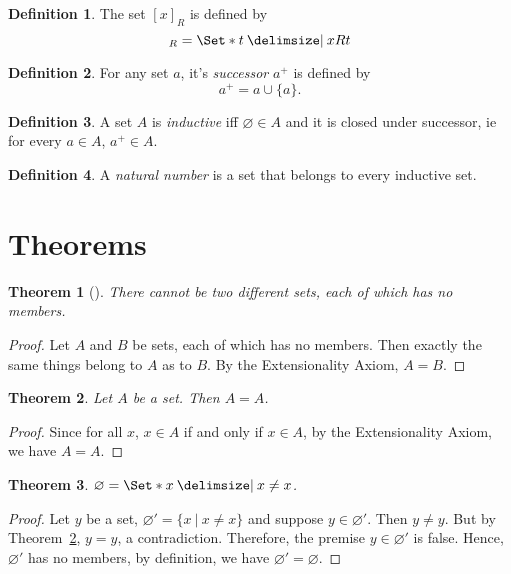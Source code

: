 \documentclass[12pt]{article}
\theoremstyle{plain}
\newtheorem{thm}{Theorem}[section]
\theoremstyle{remark}
\theoremstyle{definition}
\newtheorem{defn}{Definition}[section]
\theoremstyle{remark}
\newcommand{\thmproof}[3]{%
  \begin{thm}[#1]
    #2
  \end{thm}
  \begin{proof}
    #3
  \end{proof}
}
\providecommand\st{}
\newcommand\SetSymbol[1][]{%
  \nonscript\:#1\vert%
  \allowbreak%
  \nonscript\:
\mathopen{}}
\renewcommand\st{\SetSymbol[\delimsize]}
\begin{document}
\begin{defn}
  The set $[x]_R$ is defined by
  \begin{equation*}
    [x]_R = \Set*{t \st xRt}
  \end{equation*}
\end{defn}

\begin{defn}
  For any set $a$, it's \textit{successor} $a^+$ is defined by
  \begin{equation*}
    a^+ = a \cup \{a\}.
  \end{equation*}
\end{defn}

\begin{defn}
  A set $A$ is \textit{inductive} iff $\varnothing \in A$ and it is closed under successor, ie for every $a \in A$, $a^+ \in A$.
\end{defn}

\begin{defn}
  A \textit{natural number} is a set that belongs to every inductive set.
\end{defn}

\section{Theorems}
\thmproof{}{There cannot be two different sets, each of which has no members.}
{Let $A$ and $B$ be sets, each of which has no members. Then exactly the same things belong to $A$ as to $B$. By the Extensionality Axiom, $A = B$.
}

\begin{thm}\label{identity}
  Let $A$ be a set. Then $A = A$.
\end{thm}
\begin{proof}
  Since for all $x$, $x \in A$ if and only if $x \in A$, by the Extensionality Axiom, we have $A = A$.
\end{proof}

\begin{thm}
  $\varnothing = \Set*{x \st x \neq x}$.
\end{thm}
\begin{proof}
  Let $y$ be a set, $\varnothing' = \{x\ |\ x \neq x\}$ and suppose $y \in \varnothing'$. Then $y \neq y$. But by Theorem~\ref{identity}, $y = y$, a contradiction. Therefore, the premise $y \in \varnothing'$ is false. Hence, $\varnothing'$ has no members, by definition, we have $\varnothing' = \varnothing$.
\end{proof}
\end{document}
